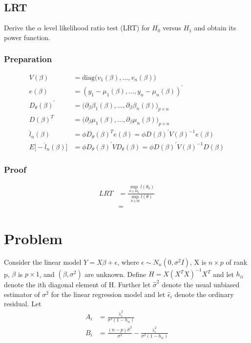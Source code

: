 \documentclass[11pt]{article} %
\begin{document}
\subsection{LRT }

Derive the $\alpha$ level likelihood ratio test (LRT) for $H_0$ versus $H_1$ and obtain its power function.


\subsubsection{Preparation}
\begin{align*}
	V(\beta) &= \text{diag} \Big( v_1(\beta), …, v_n(\beta) \Big) \\
	e(\beta) &= (y_1 - \mu_1(\beta), …, y_n- \mu_n(\beta))^{'} \\
	D_{\theta} (\beta)^{'} &= \Big( \partial_{\beta} \beta_1(\beta),…,  \partial_{\beta} \beta_n(\beta)\Big)_{p \times n} \\
	D (\beta)^{T} &= \Big( \partial_{\beta} \mu_1(\beta),…,  \partial_{\beta} \mu_n(\beta) \Big)_{p \times n} \\
	\dot{l}_n(\beta) &= \phi D_{\theta}(\beta)^{T} e(\beta) = \phi D(\beta)^{'} V(\beta)^{-1} e(\beta) \\
	E \Big[ -\ddot{l}_n(\beta) \Big] &= \phi D_{\theta}(\beta)^{'} V D_{\theta}(\beta) = \phi D(\beta)^{'} V(\beta)^{-1} D(\beta) 
\end{align*}

\subsubsection{Proof}

\begin{align*}
	LRT &= \frac{\underset{\theta \in \Theta_0}{\sup} l(\theta_0)}{\underset{\theta \in \Theta}{\sup} l(\theta)} \\
	&= 
\end{align*}




\section{Problem }
Consider the linear model $Y = X \beta + \epsilon$, where $\epsilon \sim N_n(0, \sigma^2 I)$, X is $n \times p$ of rank p, $\beta$ is $p \times 1$, and $(\beta, \sigma^2)$ are unknown. Define $H = X(X^TX)^{-1}X^T$ and let $h_{ii}$ denote the ith diagonal element of H. Further let $\hat{\sigma}^2$ denote the usual unbiased estimator of $\sigma^2$ for the linear regression model and let $\hat{\epsilon}_i$ denote the ordinary residual. Let 
\begin{align*}
	A_i & = \frac{\hat{\epsilon}_i^2}{\sigma^2(1-h_{ii})} \\
	B_i & = \frac{(n-p)\hat{\sigma}^2 }{\sigma^2} - \frac{\hat{\epsilon}_i^2}{\sigma^2(1-h_{ii})}
\end{align*}
\end{document}
